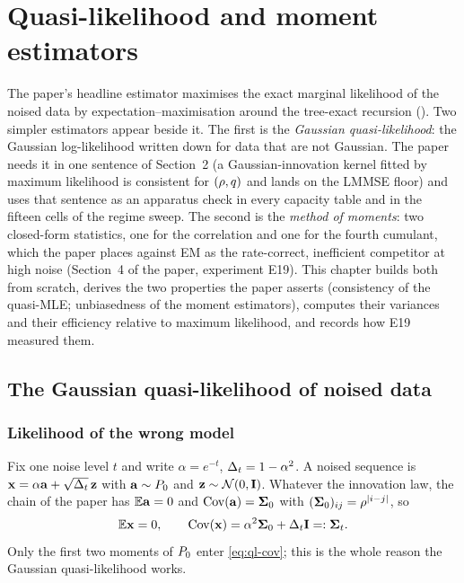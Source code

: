 \chapter{Quasi-likelihood and moment estimators}
\label{ch:quasi-likelihood-moments}

The paper's headline estimator maximises the exact marginal likelihood of the noised
data by expectation--maximisation around the tree-exact recursion
(). Two simpler estimators appear
beside it. The first is the \emph{Gaussian quasi-likelihood}: the Gaussian
log-likelihood written down for data that are not Gaussian. The paper needs it in one
sentence of Section~2 (a Gaussian-innovation kernel fitted by maximum likelihood is
consistent for $(\rho,q)$ and lands on the LMMSE floor) and uses that sentence as
an apparatus check in every capacity table and in the fifteen cells of the regime
sweep. The second is the \emph{method of moments}: two closed-form statistics, one for
the correlation and one for the fourth cumulant, which the paper places against EM as
the rate-correct, inefficient competitor at high noise (Section~4 of the paper,
experiment E19). This chapter builds both from scratch, derives the two properties the
paper asserts (consistency of the quasi-MLE; unbiasedness of the moment estimators),
computes their variances and their efficiency relative to maximum likelihood, and
records how E19 measured them.

\section{The Gaussian quasi-likelihood of noised data}
\label{sec:ql-def}

\subsection{Likelihood of the wrong model}

Fix one noise level $t$ and write $\alpha=e^{-t}$, $\Delta_t=1-\alpha^2$. A noised sequence
is $\mathbf{x}=\alpha\mathbf{a}+\sqrt{\Delta_t}\,\mathbf{z}$ with $\mathbf{a}\sim P_0$ and $\mathbf{z}\sim\mathcal{N}\!\left(0,\mathbf{I}\right)$.
Whatever the innovation law, the chain of the paper has
$\mathbb{E}\mathbf{a}=0$ and $\operatorname{Cov}(\mathbf{a})=\mathbf{\Sigma}_0$ with $(\mathbf{\Sigma}_0)_{ij}=\rho^{|i-j|}$, so
\begin{equation}
  \mathbb{E}\mathbf{x}=0,\qquad \operatorname{Cov}(\mathbf{x})=\alpha^2\mathbf{\Sigma}_0+\Delta_t\mathbf{I}=:\mathbf{\Sigma}_t .
  \label{eq:ql-cov}
\end{equation}
Only the first two moments of $P_0$ enter \cref{eq:ql-cov}; this is the whole reason the
Gaussian quasi-likelihood works.

